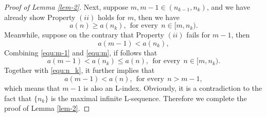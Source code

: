 \documentclass[12pt,reqno]{amsart}
\renewcommand{\=}{\coloneqq}
\theoremstyle{plain}
\begin{document}
\begin{proof}[Proof of Lemma \ref{lem-2}]
Next, suppose $m,m-1\in (n_{k-1},n_{k})$, and we have already show Property $(ii)$ holds for $m$, then we have
\begin{equation}\label{equ:m-1}
a(n)\geq a(n_{k}),~~\mbox{for every}~~n\in[m,n_{k}).
\end{equation}
Meanwhile, suppose on the contrary that Property $(ii)$ fails for $m-1$, then
\begin{equation}\label{equ:m}
a(m-1)<a(n_{k}),
\end{equation}
Combining \eqref{equ:m-1} and \eqref{equ:m}, if follows that
\begin{equation}\label{equ:m-12}
a(m-1)<a(n_{k})\leq a(n),~~\mbox{for every}~~n\in[m,n_{k}).
\end{equation}
Together with \eqref{equ:n_k}, it further implies that
\begin{equation}
a(m-1)<a(n),~~\mbox{for every}~~n>m-1,
\end{equation}
which means that $m-1$ is also an L-index. Obviously, it is a contradiction to the fact that $\{n_{k}\}$ is the maximal infinite L-sequence. Therefore we complete the proof of Lemma \ref{lem-2}.
\end{proof}
\end{document}
